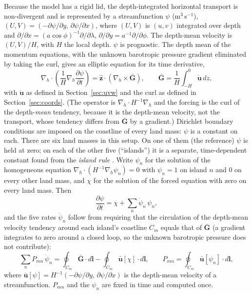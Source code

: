 \documentclass{article}
\begin{document}
Because the model has a rigid lid, the depth-integrated horizontal transport is non-divergent and is represented by a streamfunction $\psi$ (m$^3$\,s$^{-1}$), $(U,V) = (-\partial\psi/\partial y,\, \partial\psi/\partial x)$, where $(U,V)$ is $(u,v)$ integrated over depth and $\partial/\partial x = (a\cos\phi)^{-1}\partial/\partial\lambda$, $\partial/\partial y = a^{-1}\partial/\partial\phi$.
The depth-mean velocity is $(U,V)/H$, with $H$ the local depth.
$\psi$ is prognostic. The depth mean of the momentum equations, with the unknown barotropic pressure gradient eliminated by taking the curl, gives an elliptic equation for its time derivative,
\[
\nabla_h\cdot\left( \frac{1}{H}\nabla_h \frac{\partial \psi}{\partial t} \right) = \hat{\mathbf{z}}\cdot\left(\nabla_h\times \bar{\mathbf{G}}\right), \qquad \bar{\mathbf{G}} = \frac{1}{H}\int_{-H}^0 \dot{\mathbf{u}}\,dz,
\]
with $\dot{\mathbf{u}}$ as defined in Section~\ref{sec:uvw} and the curl as defined in Section~\ref{sec:coords}.
(The operator is $\nabla_h\cdot H^{-1}\nabla_h$ and the forcing is the curl of the depth-\emph{mean} tendency, because it is the depth-mean velocity, not the transport, whose tendency differs from $\bar{\mathbf{G}}$ by a gradient.)
Dirichlet boundary conditions are imposed on the coastline of every land mass: $\psi$ is a constant on each.
There are six land masses in this setup. On one of them (the reference) $\psi$ is held at zero; on each of the other five (``islands'') it is a separate, time-dependent constant found from the \emph{island rule} \citep{godfrey1989}.
Write $\psi_n$ for the solution of the homogeneous equation $\nabla_h\cdot(H^{-1}\nabla_h\psi_n)=0$ with $\psi_n=1$ on island $n$ and $0$ on every other land mass, and $\chi$ for the solution of the forced equation with zero on every land mass. Then
\[
\frac{\partial\psi}{\partial t} = \chi + \sum_{n} \dot\psi_n\, \psi_n ,
\]
and the five rates $\dot\psi_n$ follow from requiring that the circulation of the depth-mean velocity tendency around each island's coastline $C_m$ equals that of $\bar{\mathbf{G}}$ (a gradient integrates to zero around a closed loop, so the unknown barotropic pressure does not contribute):
\[
\sum_n P_{mn}\, \dot\psi_n = \oint_{C_m} \bar{\mathbf{G}}\cdot d\mathbf{l} - \oint_{C_m} \bar{\mathbf{u}}[\chi]\cdot d\mathbf{l},
\qquad
P_{mn} = \oint_{C_m} \bar{\mathbf{u}}[\psi_n]\cdot d\mathbf{l},
\]
where $\bar{\mathbf{u}}[\psi] = H^{-1}(-\partial\psi/\partial y,\, \partial\psi/\partial x)$ is the depth-mean velocity of a streamfunction. $P_{mn}$ and the $\psi_n$ are fixed in time and computed once.
\end{document}
